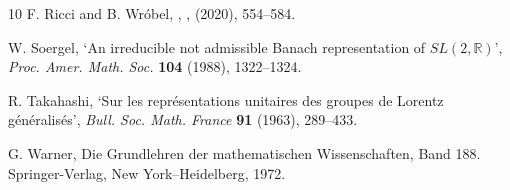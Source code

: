 \documentclass[12pt,a4paper]{amsart}
\theoremstyle{definition}
\theoremstyle{remark}
\numberwithin{equation}{section}
\begin{document}
\begin{thebibliography}{10}
F. Ricci and B. Wróbel,
,
,
 (2020),
554--584.

W. Soergel,
`An irreducible not admissible Banach representation of ${SL}(2, \mathbb{R})$',
\textit{Proc. Amer. Math. Soc.}  \textbf{104} (1988), 1322--1324.

R. Takahashi, 
`Sur les repr\'esentations unitaires des groupes de Lorentz g\'en\'eralis\'es',
\textit{Bull. Soc. Math. France} \textbf{91} (1963), 289--433.


G. Warner, 
Die Grundlehren der mathematischen Wissenschaften, Band 188.
Springer-Verlag, New York--Heidelberg, 1972. 

\end{thebibliography}
\end{document}

